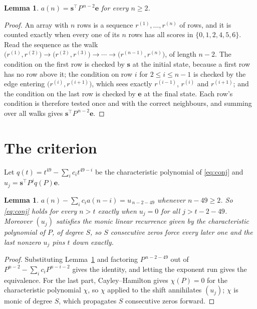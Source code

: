 \documentclass[11pt,a4paper]{article}
\theoremstyle{plain}
\newtheorem{lemma}[theorem]{Lemma}
\theoremstyle{definition}
\begin{document}
\begin{lemma}\label{lem:walk}
$a(n)=\mathbf{s}^{\!\top}P^{\,n-2}\mathbf{e}$ for every $n\ge2$.
\end{lemma}

\begin{proof}
An array with $n$ rows is a sequence $r^{(1)},\dots,r^{(n)}$ of rows, and it is counted
exactly when every one of its $n$ rows has all scores in $\{0,1,2,4,5,6\}$. Read the sequence as the
walk $\bigl(r^{(1)},r^{(2)}\bigr)\to\bigl(r^{(2)},r^{(3)}\bigr)\to\cdots\to
\bigl(r^{(n-1)},r^{(n)}\bigr)$, of length $n-2$. The condition on the first row is
checked by $\mathbf{s}$ at the initial state, because a first row has no row above it; the
condition on row $i$ for $2\le i\le n-1$ is checked by the edge entering
$\bigl(r^{(i)},r^{(i+1)}\bigr)$, which sees exactly $r^{(i-1)}$, $r^{(i)}$ and
$r^{(i+1)}$; and the condition on the last row is checked by $\mathbf{e}$ at the final
state. Each row's condition is therefore tested once and with the correct neighbours, and
summing over all walks gives $\mathbf{s}^{\!\top}P^{\,n-2}\mathbf{e}$.
\end{proof}

\section{The criterion}

Let $q(t)=t^{49}-\sum_i c_i t^{49-i}$ be the characteristic polynomial of
\eqref{eq:conj} and $u_j=\mathbf{s}^{\!\top}P^{j}q(P)\mathbf{e}$.

\begin{lemma}\label{lem:crit}
$a(n)-\sum_i c_i a(n-i)=u_{\,n-2-49}$ whenever $n-49\ge2$. So \eqref{eq:conj}
holds for every $n>t$ exactly when $u_j=0$ for all $j>t-2-49$. Moreover $(u_j)$
satisfies the monic linear recurrence given by the characteristic polynomial of $P$, of
degree $S$, so $S$ consecutive zeros force every later one and the last nonzero $u_j$ pins
$t$ down exactly.
\end{lemma}

\begin{proof}
Substituting Lemma~\ref{lem:walk} and factoring $P^{\,n-2-49}$ out of
$P^{n-2}-\sum_i c_i P^{n-i-2}$ gives the identity, and letting the exponent run gives the
equivalence. For the last part, Cayley--Hamilton gives $\chi(P)=0$ for the characteristic
polynomial $\chi$, so $\chi$ applied to the shift annihilates $(u_j)$; $\chi$ is monic of
degree $S$, which propagates $S$ consecutive zeros forward.
\end{proof}
\end{document}
